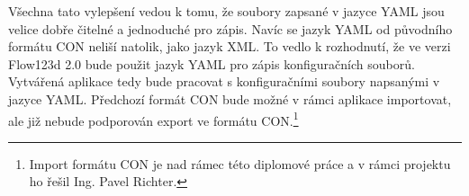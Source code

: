 \documentclass[FM,bw,DP]{tulthesis}
\begin{document}
Všechna tato vylepšení vedou k tomu, že soubory zapsané v jazyce YAML jsou velice dobře čitelné a jednoduché pro zápis. Navíc se jazyk YAML od původního formátu CON neliší natolik, jako jazyk XML. To vedlo k rozhodnutí, že ve verzi Flow123d 2.0 bude použit jazyk YAML pro zápis konfiguračních souborů. Vytvářená aplikace tedy bude pracovat s konfiguračními soubory napsanými v jazyce YAML. Předchozí formát CON bude možné v rámci aplikace importovat, ale již nebude podporován export ve formátu CON.\footnote{Import formátu CON je nad rámec této diplomové práce a v rámci projektu ho řešil Ing. Pavel Richter.}


%
%
%
%


\end{document}
